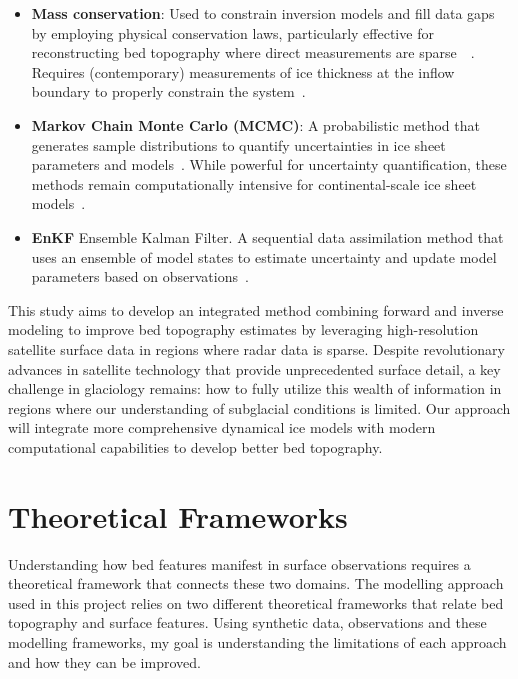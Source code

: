 \begin{itemize}
\begin{itemize}
            \item\textbf{Mass conservation}: Used to constrain inversion models and fill data gaps by employing physical conservation laws, particularly effective for reconstructing bed topography where direct measurements are sparse~~\cite{Morlighem_2017, Morlighem_2020}. Requires (contemporary) measurements of ice thickness at the inflow boundary to properly constrain the system~\cite{Morlighem_Goldberg_2024}.

            \item\textbf{Markov Chain Monte Carlo (MCMC)}: A probabilistic method that generates sample distributions to quantify uncertainties in ice sheet parameters and models~\cite{Morlighem_Goldberg_2024}. While powerful for uncertainty quantification, these methods remain computationally intensive for continental-scale ice sheet models~\cite{Morlighem_Goldberg_2024}.

            \item\textbf{EnKF} Ensemble Kalman Filter. A sequential data assimilation method that uses an ensemble of model states to estimate uncertainty and update model parameters based on observations~\cite{Morlighem_Goldberg_2024}.
        \end{itemize}
    
\end{itemize} 
This study aims to develop an integrated method combining forward and inverse modeling to improve bed topography estimates by leveraging high-resolution satellite surface data in regions where radar data is sparse. Despite revolutionary advances in satellite technology that provide unprecedented surface detail, a key challenge in glaciology remains: how to fully utilize this wealth of information in regions where our understanding of subglacial conditions is limited. Our approach will integrate more comprehensive dynamical ice models with modern computational capabilities to develop better bed topography.

\newpage
\section{Theoretical Frameworks}
 Understanding how bed features manifest in surface observations requires a theoretical framework that connects these two domains. The modelling approach used in this project relies on two different theoretical frameworks that relate bed topography and surface features. Using synthetic data, observations and these modelling frameworks, my goal is understanding the limitations of each approach and how they can be improved.

